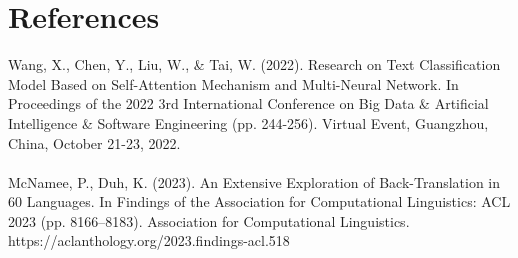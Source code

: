 \section*{References}

Wang, X., Chen, Y., Liu, W., \& Tai, W. (2022). Research on Text Classification Model Based on Self-Attention Mechanism and Multi-Neural Network. In Proceedings of the 2022 3rd International Conference on Big Data \& Artificial Intelligence \& Software Engineering (pp. 244-256). Virtual Event, Guangzhou, China, October 21-23, 2022. \\\\

McNamee, P., Duh, K. (2023). An Extensive Exploration of Back-Translation in 60 Languages. In Findings of the Association for Computational Linguistics: ACL 2023 (pp. 8166–8183). Association for Computational Linguistics. https://aclanthology.org/2023.findings-acl.518 \\\\
